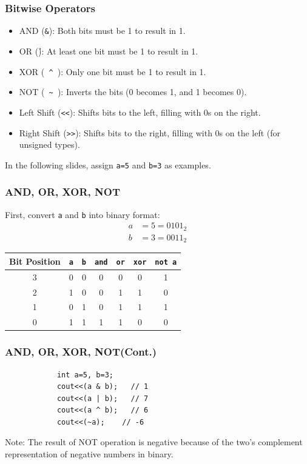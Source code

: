 \documentclass[xcolor=dvipsnames]{beamer}
\begin{document}
    \begin{frame}
        \frametitle{Bitwise Operators}
        \begin{itemize}
            \item AND (\texttt{\&}): Both bits must be 1 to result in 1.
            \item OR (\texttt{\|}): At least one bit must be 1 to result in 1.
            \item XOR (\texttt{ \^ }): Only one bit must be 1 to result in 1.
            \item NOT (\texttt{ \~ }): Inverts the bits (0 becomes 1, and 1 becomes 0).
            \item Left Shift (\texttt{<<}): Shifts bits to the left, filling with 0s on the right.
            \item Right Shift (\texttt{>>}): Shifts bits to the right, filling with 0s on the left (for unsigned types).
        \end{itemize}
        In the following slides, assign \texttt{a=5} and \texttt{b=3} as examples.\\
    \end{frame}

    \begin{frame}
        \frametitle{AND, OR, XOR, NOT}
        First, convert \texttt{a} and \texttt{b} into binary format:
        \begin{align*}
            a &= 5 = 0101_2 \\
            b &= 3 = 0011_2
        \end{align*}
        \begin{table}[h]
            \centering
            \begin{tabular}{c || c c || c | c | c | c}
                \toprule
                Bit Position & \texttt{a} & \texttt{b} & \texttt{and} & \texttt{or} & \texttt{xor} & \texttt{not a} \\
                \midrule
                3 & 0 & 0 & 0 & 0 & 0 & 1 \\
                2 & 1 & 0 & 0 & 1 & 1 & 0 \\
                1 & 0 & 1 & 0 & 1 & 1 & 1 \\
                0 & 1 & 1 & 1 & 1 & 0 & 0 \\
                \bottomrule
            \end{tabular}
        \end{table}
    \end{frame}
    \begin{frame}[fragile]
        \frametitle{AND, OR, XOR, NOT(Cont.)}
        \begin{verbatim}
            int a=5, b=3;
            cout<<(a & b);   // 1
            cout<<(a | b);   // 7
            cout<<(a ^ b);   // 6
            cout<<(~a);    // -6
        \end{verbatim}
        Note: The result of NOT operation is negative because of the two's complement representation of negative numbers in binary.
    \end{frame}
\end{document}
